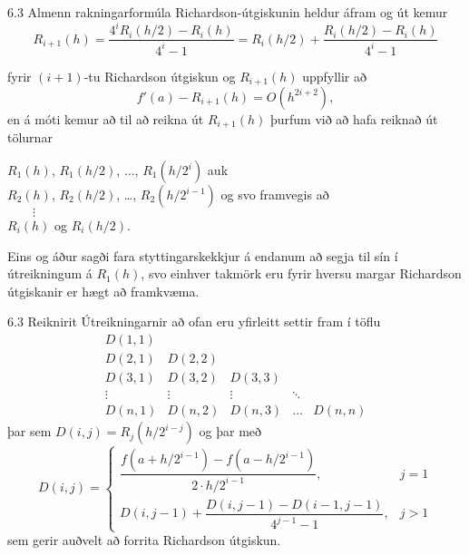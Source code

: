 \begin{frame}{6.3 Almenn rakningarformúla} 
Richardson-útgiskunin heldur áfram og út kemur
\begin{equation*}
  R_{i+1}(h) = \frac{4^i R_i(h/2) - R_i(h)}{4^i-1}
  = R_i(h/2) + \frac{R_i(h/2)-R_i(h)}{4^i-1}
\end{equation*}

fyrir $(i+1)$-tu Richardson útgiskun og $R_{i+1}(h)$ uppfyllir að
\begin{equation*}
  f'(a) - R_{i+1}(h) = O(h^{2i+2}),
\end{equation*}
en á móti kemur að til að reikna út $R_{i+1}(h)$ þurfum við að hafa
reiknað út tölurnar 

$R_1(h)$, $R_1(h/2)$, $\ldots$, $R_1(h/2^i)$ auk \\
$R_2(h)$, $R_2(h/2)$, \ldots, $R_2(h/2^{i-1})$ og svo framvegis að\\
$\qquad \vdots$ \\
$R_i(h)$ og $R_i(h/2)$. 

\pause 
\smallskip
Eins og áður sagði fara styttingarskekkjur á endanum að
segja til sín í útreikningum á $R_1(h)$, svo einhver takmörk eru fyrir
hversu margar Richardson útgiskanir er hægt að framkvæma. 
\end{frame}


\begin{frame}{6.3 Reiknirit} 
Útreikningarnir að ofan eru yfirleitt settir fram í töflu
\begin{equation*}
  \begin{array}{ccccc}
    D(1,1) &   &   &   &   \\
    D(2,1) & D(2,2) &  &  &  \\
    D(3,1) & D(3,2) & D(3,3) & & \\
    \vdots & \vdots & \vdots & \ddots & \\
    D(n,1) & D(n,2) & D(n,3) & \ldots & D(n,n)
  \end{array}
\end{equation*}
þar sem $D(i,j) = R_j(h/2^{i-j})$ og þar með
\begin{equation*}
  D(i,j) = \begin{cases}
    \dfrac{f(a+h/2^{i-1})-f(a-h/2^{i-1})}{2\cdot h/2^{i-1}}, & j = 1 \\
    D(i,j-1) + \dfrac{D(i,j-1)-D(i-1,j-1)}{4^{j-1}-1}, & j > 1
  \end{cases}
\end{equation*}
sem gerir auðvelt að forrita Richardson útgiskun. 
\end{frame}


